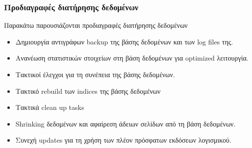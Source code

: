 \subsubsection{Προδιαγραφές διατήρησης δεδομένων}
Παρακάτω παρουσιάζονται προδιαγραφές διατήρησης δεδομένων
\begin{itemize}
    \item Δημιουργία αντιγράφων backup της βάσης δεδομένων και των log files της.
    \item Ανανέωση στατιστικών στοιχείων στη βάση δεδομένων για optimized λειτουργία.
    \item Τακτικοί έλεγχοι για τη συνέπεια της βάσης δεδομένων.
    \item Τακτικό rebuild των indices της βάσης δεδομένων
    \item Τακτικά clean up tasks
    \item Shrinking δεδομένων και αφαίρεση άδειων σελίδων από τη βάση δεδομένων.
    \item Συνεχή updates για τη χρήση των πλέον πρόσφατων εκδόσεων λογισμικού.

\end{itemize}
